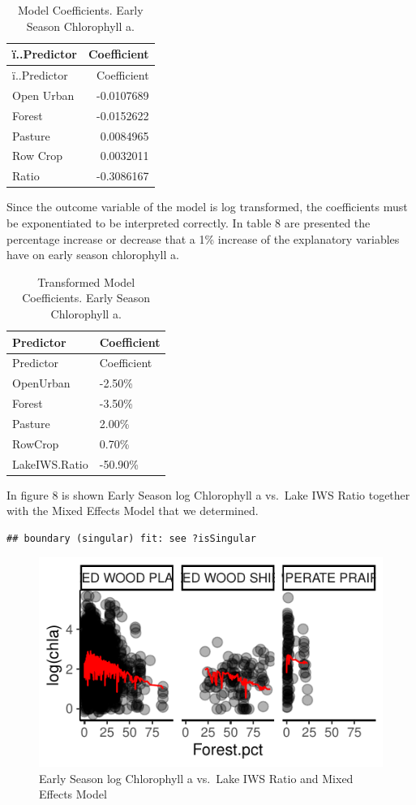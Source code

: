 \documentclass[12pt,]{article}
\begin{document}
\begin{longtable}[]{@{}lr@{}}
\caption{Model Coefficients. Early Season Chlorophyll a.}\tabularnewline
\toprule
ï..Predictor & Coefficient\tabularnewline
\midrule
\endfirsthead
\toprule
ï..Predictor & Coefficient\tabularnewline
\midrule
\endhead
Open Urban & -0.0107689\tabularnewline
Forest & -0.0152622\tabularnewline
Pasture & 0.0084965\tabularnewline
Row Crop & 0.0032011\tabularnewline
Ratio & -0.3086167\tabularnewline
\bottomrule
\end{longtable}

Since the outcome variable of the model is log transformed, the
coefficients must be exponentiated to be interpreted correctly. In table
8 are presented the percentage increase or decrease that a 1\% increase
of the explanatory variables have on early season chlorophyll a.

\begin{longtable}[]{@{}ll@{}}
\caption{Transformed Model Coefficients. Early Season Chlorophyll
a.}\tabularnewline
\toprule
Predictor & Coefficient\tabularnewline
\midrule
\endfirsthead
\toprule
Predictor & Coefficient\tabularnewline
\midrule
\endhead
OpenUrban & -2.50\%\tabularnewline
Forest & -3.50\%\tabularnewline
Pasture & 2.00\%\tabularnewline
RowCrop & 0.70\%\tabularnewline
LakeIWS.Ratio & -50.90\%\tabularnewline
\bottomrule
\end{longtable}

In figure 8 is shown Early Season log Chlorophyll a vs.~Lake IWS Ratio
together with the Mixed Effects Model that we determined.

\begin{verbatim}
## boundary (singular) fit: see ?isSingular
\end{verbatim}

\begin{figure}
\centering
\includegraphics{Bollt_Greif_Raby_Roth_Project_Final_files/figure-latex/unnamed-chunk-19-1.pdf}
\caption{Early Season log Chlorophyll a vs.~Lake IWS Ratio and Mixed
Effects Model}
\end{figure}
\end{document}
